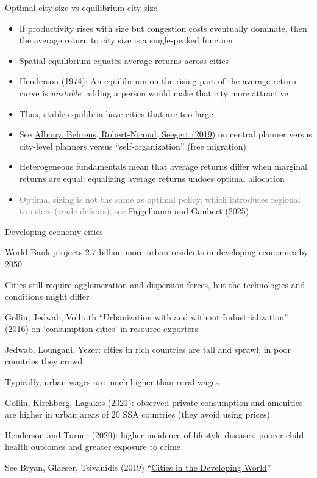 \documentclass[11pt,notes=hide,aspectratio=169]{beamer}
\begin{document}
\begin{frame}{Optimal city size vs equilibrium city size}
\begin{itemize}
\item If productivity rises with size but congestion costs eventually dominate, then the average return to city size is a single-peaked function
\item Spatial equilibrium equates average returns across cities
\item Henderson (1974): An equilibrium on the rising part of the average-return curve is \textit{unstable}:
adding a person would make that city more attractive
\item Thus, stable equilibria have cities that are too large
\item See \href{https://doi.org/10.1016/j.jue.2018.08.004}{Albouy, Behrens, Robert-Nicoud, Seegert (2019)}
on central planner versus city-level planners versus ``self-organization'' (free migration)
\item Heterogeneous fundamentals mean that average returns differ when marginal returns are equal:
equalizing average returns undoes optimal allocation
\item[] \textcolor{gray}{Optimal sizing is not the same as optimal policy, which introduces regional transfers (trade deficits); see \href{https://doi.org/10.1016/bs.hesreg.2025.06.005}{Fajgelbaum and Gaubert (2025)}}
\end{itemize}
\end{frame}
\begin{frame}{Developing-economy cities}
\begin{itemize}{\small
\item World Bank projects 2.7 billion more urban residents in developing economies by 2050
\item Cities still require agglomeration and dispersion forces, but the technologies and conditions might differ
\item Gollin, Jedwab, Vollrath ``Urbanization with and without Industrialization'' (2016) on `consumption cities' in resource exporters
\item Jedwab, Loungani, Yezer: cities in rich countries are tall and sprawl; in poor countries they crowd
\item Typically, urban wages are much higher than rural wages
\item \href{https://doi.org/10.1016/j.jue.2020.103301}{Gollin, Kirchberg, Lagakos (2021)}: observed private consumption and amenities are higher in urban areas of 20 SSA countries (they avoid using prices)
\item Henderson and Turner (2020): higher incidence of lifestyle diseases, poorer child health outcomes and greater exposure to
crime
\item See Bryan, Glaeser, Tsivanidis (2019) ``\href{https://doi.org/10.1146/annurev-economics-080218-030303}{Cities in the Developing World}''
}\end{itemize}
\end{frame}
\end{document}

